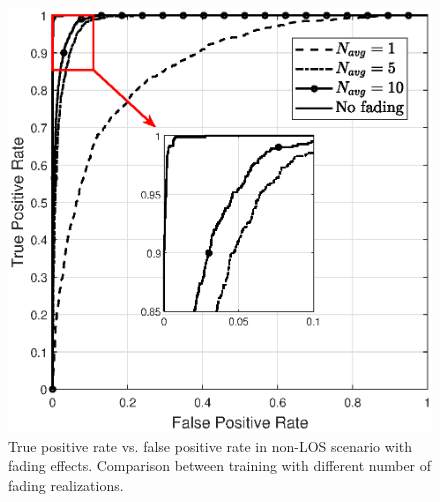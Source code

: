 \documentclass[draftcls,onecolumn,12pt]{IEEEtran}
\begin{document}
\begin{figure}
    \centering
    \includegraphics[width=0.5\columnwidth]{Navg.eps}
    \caption{True positive rate vs. false positive rate in non-LOS scenario with fading effects. Comparison between training with different number of fading realizations.}
    \label{fig:faded}
\end{figure}
\newpage 



%
%
\renewcommand*{\bibfont}{\footnotesize}

\printbibliography
\end{document}
